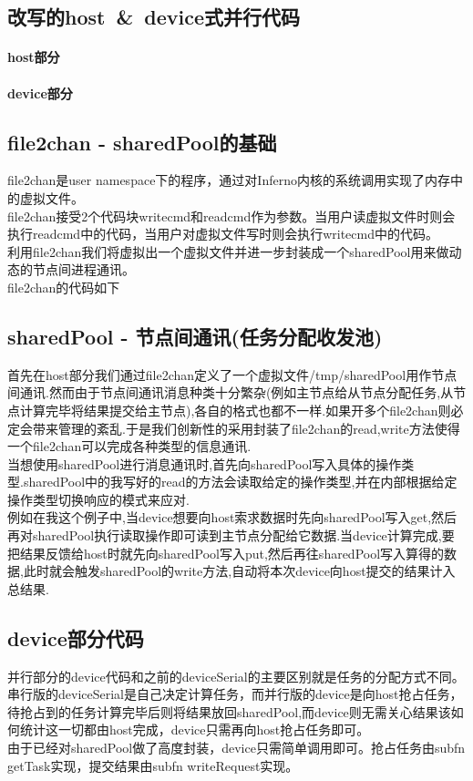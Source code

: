 \documentclass[paper=a4]{ctexart} %
\numberwithin{equation}{section} %
\numberwithin{figure}{section} %
\numberwithin{table}{section} %
\newcommand{\n}{\\\indent}
\begin{document}
\subsection{改写的host~\&~device式并行代码}
\paragraph{host部分}  

\paragraph{device部分}
  

\subsection{file2chan - sharedPool的基础}
file2chan是user namespace下的程序，通过对Inferno内核的系统调用实现了内存中的虚拟文件。\n
file2chan接受2个代码块writecmd和readcmd作为参数。当用户读虚拟文件时则会执行readcmd中的代码，当用户对虚拟文件写时则会执行writecmd中的代码。\n
利用file2chan我们将虚拟出一个虚拟文件并进一步封装成一个sharedPool用来做动态的节点间进程通讯。\n
file2chan的代码如下



\subsection{sharedPool - 节点间通讯(任务分配收发池)}
首先在host部分我们通过file2chan定义了一个虚拟文件/tmp/sharedPool用作节点间通讯.然而由于节点间通讯消息种类十分繁杂(例如主节点给从节点分配任务,从节点计算完毕将结果提交给主节点),各自的格式也都不一样.如果开多个file2chan则必定会带来管理的紊乱.于是我们创新性的采用封装了file2chan的read,write方法使得一个file2chan可以完成各种类型的信息通讯. \n
当想使用sharedPool进行消息通讯时,首先向sharedPool写入具体的操作类型.sharedPool中的我写好的read的方法会读取给定的操作类型,并在内部根据给定操作类型切换响应的模式来应对. \n
例如在我这个例子中,当device想要向host索求数据时先向sharedPool写入get,然后再对sharedPool执行读取操作即可读到主节点分配给它数据.当device计算完成,要把结果反馈给host时就先向sharedPool写入put,然后再往sharedPool写入算得的数据,此时就会触发sharedPool的write方法,自动将本次device向host提交的结果计入总结果.

\subsection{device部分代码}
并行部分的device代码和之前的deviceSerial的主要区别就是任务的分配方式不同。串行版的deviceSerial是自己决定计算任务，而并行版的device是向host抢占任务，待抢占到的任务计算完毕后则将结果放回sharedPool,而device则无需关心结果该如何统计这一切都由host完成，device只需再向host抢占任务即可。\n
由于已经对sharedPool做了高度封装，device只需简单调用即可。抢占任务由subfn getTask实现，提交结果由subfn writeRequest实现。
\end{document}
